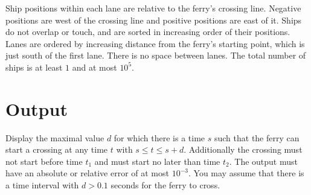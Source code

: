 Ship positions within each lane are relative to the ferry's crossing line.
Negative positions are west of the crossing line and positive positions are east of it.
Ships do not overlap or touch, and are sorted in increasing order of their positions.
Lanes are ordered by increasing distance from the ferry's starting point, which is just south of the first lane.
There is no space between lanes.
The total number of ships is at least $1$ and at most $10^5$.

\section*{Output}

Display the maximal value $d$ for which there is a time $s$ such that the ferry can start a crossing at any time $t$ with $s \leq t \leq s+d$.
Additionally the crossing must not start before time $t_1$ and must start no later than time $t_2$.
The output must have an absolute or relative error of at most $10^{-3}$.
You may assume that there is a time interval with $d > 0.1$ seconds for the ferry to cross.

